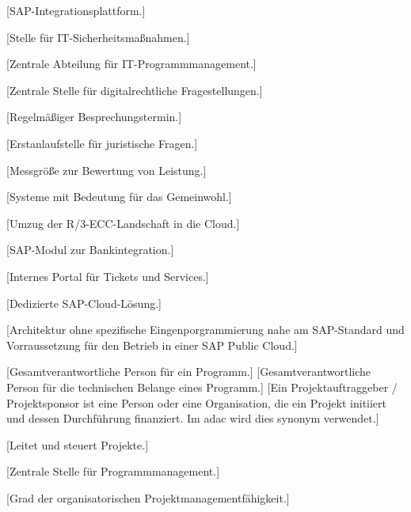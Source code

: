 [SAP-Integrationsplattform.]

[Stelle für IT-Sicherheitsmaßnahmen.]

[Zentrale Abteilung für IT-Programmmanagement.]

[Zentrale Stelle für digitalrechtliche Fragestellungen.]

[Regelmäßiger Besprechungstermin.]

[Erstanlaufstelle für juristische Fragen.]

[Messgröße zur Bewertung von Leistung.]

[Systeme mit Bedeutung für das Gemeinwohl.]

[Umzug der R/3-ECC-Landschaft in die Cloud.]

[SAP-Modul zur Bankintegration.]

[Internes Portal für Tickets und Services.]

[Dedizierte SAP-Cloud-Lösung.]

[Architektur ohne spezifische Eingenporgrammierung nahe am SAP-Standard und Vorraussetzung für den Betrieb in einer SAP Public Cloud.]

[Gesamtverantwortliche Person für ein Programm.]
[Gesamtverantwortliche Person für die technischen Belange eines Programm.]
[Ein Projektauftraggeber / Projektsponsor ist eine Person oder eine Organisation, die ein Projekt initiiert und dessen Durchführung finanziert. Im \gls{adac} wird dies synonym verwendet.]


[Leitet und steuert Projekte.]

[Zentrale Stelle für Programmmanagement.]

[Grad der organisatorischen Projektmanagementfähigkeit.]

